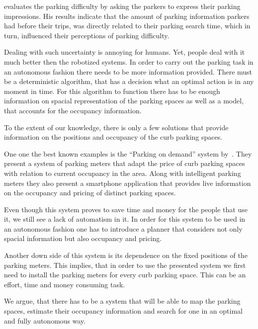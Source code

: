 \citet{rodrigue2013geography} evaluates the parking difficulty by asking the
parkers to express their parking impressions. His results indicate that the
amount of parking information parkers had before their trips, was directly
related to their parking search time, which in turn, influenced their
perceptions of parking difficulty.

Dealing with such uncertainty is annoying for humans. Yet, people deal with it
much better then the robotized systems. In order to carry out the parking task
in an autonomous fashion there needs to be more information provided. There
must be a deterministic algorithm, that has a decision what an optimal action
is in any moment in time. For this algorithm to function there has to be
enough information on spacial representation of the parking spaces as well as
a model, that accounts for the occupancy information.

To the extent of our knowledge, there is only a few solutions that provide
information on the positions and occupancy of the curb parking spaces.

One one the best known examples is the ``Parking on demand'' system
by~\citet{sfo,sfo2}. They present a system of parking meters that adapt the
price of curb parking spaces with relation to current occupancy in the area.
Along with intelligent parking meters they also present a smartphone
application that provides live information on the occupancy and pricing of
distinct parking spaces.

Even though this system proves to save time and money for the people that use
it, we still see a lack of automatism in it. In order for this system to be
used in an autonomous fashion one has to introduce a planner that considers
not only spacial information but also occupancy and pricing.

Another down side of this system is its dependence on the fixed positions of
the parking meters. This implies, that in order to use the presented system we
first need to install the parking meters for every curb parking space. This
can be an effort, time and money consuming task.

We argue, that there has to be a system that will be able to map the parking
spaces, estimate their occupancy information and search for one in an optimal
and fully autonomous way.

